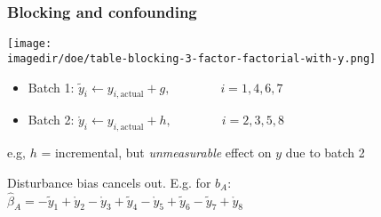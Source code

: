 \begin{frame}\frametitle{Blocking and confounding}
	\begin{center}
		\texttt{[image: \\imagedir/doe/table-blocking-3-factor-factorial-with-y.png]}
	\end{center}
	\begin{itemize}
		\item	Batch 1: $\widetilde{y}_i \leftarrow y_{i,\text{actual}} + g, \qquad\qquad i = 1, 4, 6, 7$
		\item	Batch 2: $\mathring{y}_i \leftarrow y_{i,\text{actual}} + h, \qquad\qquad i = 2, 3, 5, 8$
	\end{itemize}
	e.g, $h$ = incremental, but \emph{unmeasurable} effect on $y$ due to batch 2 
	
	\vspace{12pt}
	Disturbance bias cancels out. E.g. for $b_A$: $ \widehat{\beta}_A = -\widetilde{y}_1 + \mathring{y}_2 - \mathring{y}_3 + \widetilde{y}_4 - \mathring{y}_5 + \widetilde{y}_6 - \widetilde{y}_7 + \mathring{y}_8 $
\end{frame}

